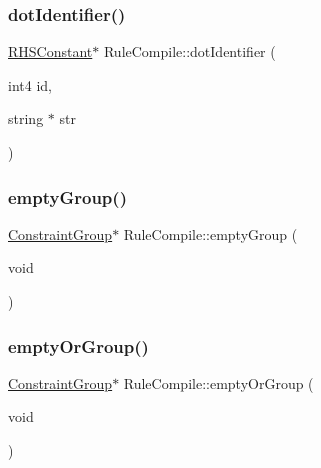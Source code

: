\mbox{\label{class_rule_compile_a64508b1420ade3674b744828f8774059}} 
\subsubsection{\texorpdfstring{dotIdentifier()}{dotIdentifier()}}
{\footnotesize\ttfamily \mbox{\hyperlink{class_r_h_s_constant}{R\+H\+S\+Constant}}$\ast$ Rule\+Compile\+::dot\+Identifier (\begin{DoxyParamCaption}\item[{int4}]{id,  }\item[{string $\ast$}]{str }\end{DoxyParamCaption})}

\mbox{\label{class_rule_compile_a2e1496d9829f01a64a34e5736f927f3d}} 
\subsubsection{\texorpdfstring{emptyGroup()}{emptyGroup()}}
{\footnotesize\ttfamily \mbox{\hyperlink{class_constraint_group}{Constraint\+Group}}$\ast$ Rule\+Compile\+::empty\+Group (\begin{DoxyParamCaption}\item[{void}]{ }\end{DoxyParamCaption})}

\mbox{\label{class_rule_compile_a48ab97e984ab674b19362ab9c9e59d0b}} 
\subsubsection{\texorpdfstring{emptyOrGroup()}{emptyOrGroup()}}
{\footnotesize\ttfamily \mbox{\hyperlink{class_constraint_group}{Constraint\+Group}}$\ast$ Rule\+Compile\+::empty\+Or\+Group (\begin{DoxyParamCaption}\item[{void}]{ }\end{DoxyParamCaption})}

\mbox{\label{class_rule_compile_a8dbf0ff983dd5ddc3aecf4e581950613}} 
